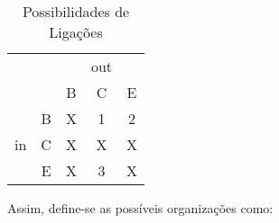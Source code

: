 \documentclass{article}
\begin{document}
                \begin{table}[H]
                    \centering
                    \begin{tabular}[]{c c | c c c}\hline
                           &   &   & out &\\
                           &   & B & C   & E\\\hline
                           & B & X & 1   & 2\\
                        in & C & X & X   & X\\
                           & E & X & 3   & X\\\hline
                    \end{tabular}
                    \caption{Possibilidades de Ligações}
                \end{table}\noindent
            Assim, define-se as possíveis organizações como:
\end{document}
